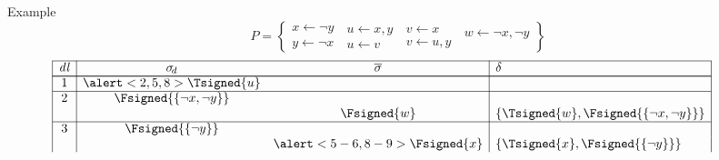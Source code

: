 \begin{frame}{Example}
  \[
    P
    =
    \left\{
      \begin{array}{l}
        x  \leftarrow  \neg y\\
        y  \leftarrow  \neg x
      \end{array}
      \
      \begin{array}{l}
        u  \leftarrow x,y\\
        u  \leftarrow v
      \end{array}
      \
      \begin{array}{l}
        v  \leftarrow x\\
        v  \leftarrow u,y
      \end{array}
      \
      \begin{array}{l}
        w  \leftarrow \neg x,\neg y\\
        \mbox{~}
      \end{array}
    \right\}
  \]
  \medskip\footnotesize
  \[
    \begin{array}{|c|cc|l|p{5pt}l}
      \cline{1-4}
      \mathit{dl}&\sigma_{\!d}                              &\overline{\sigma}                   &\delta                                                                                            &          &
      \\\cline{1-4}\cline{1-4}
      1          &\alert<2,5,8>{\Tsigned{u}                }&                                    &                                                                                                  &          &
      \\\cline{1-4}
      2          &              \Fsigned{\{\neg x,\neg y\}} &                                    &                                                                                                  &          &
      \\
                 &                                          &                \Fsigned{w}         &\{\Tsigned{w},\Fsigned{\{\neg x,\neg y\}}\}                                                       &          &
      \\\cline{1-4}
      3          &              \Fsigned{\{\neg y\}}        &                                    &                                                                                                  &          &
      \\
                 &                                          &\alert<5-6,8-9>{\Fsigned{x}}        &\{\Tsigned{x},\Fsigned{\{\neg y\}}\}                                                              &          &

\end{array}\]
\end{frame}
